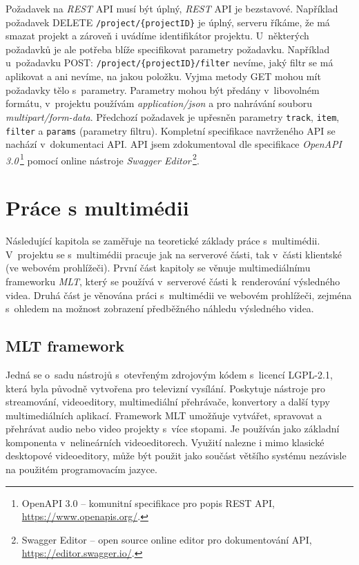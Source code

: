 Požadavek na \textit{REST} API musí být úplný, \textit{REST} API je bezstavové. Například požadavek DELETE \texttt{/project/\{projectID\}} je úplný, serveru říkáme, že má smazat projekt a zároveň i uvádíme identifikátor projektu. U~některých požadavků je ale potřeba blíže specifikovat parametry požadavku. Například u~požadavku POST: \texttt{/project/\{projectID\}/filter} nevíme, jaký filtr se má aplikovat a ani nevíme, na jakou položku. Vyjma metody GET mohou mít požadavky tělo s~parametry. Parametry mohou být předány v~libovolném formátu, v~projektu používám \textit{application/json} a pro nahrávání souboru \textit{multipart/form-data}. Předchozí požadavek je upřesněn parametry \texttt{track}, \texttt{item}, \texttt{filter} a \texttt{params} (parametry filtru). Kompletní specifikace navrženého API se nachází v~dokumentaci API. API jsem zdokumentoval dle specifikace \textit{OpenAPI 3.0}\,\footnote{OpenAPI 3.0 -- komunitní specifikace pro popis REST API, \url{https://www.openapis.org/}.} pomocí online nástroje \textit{Swagger Editor}\,\footnote{Swagger Editor -- open source online editor pro dokumentování API, \url{https://editor.swagger.io/}.}.

\chapter{Práce s multimédii}
Následující kapitola se zaměřuje na teoretické základy práce s~multimédii. V~projektu se s~multimédii pracuje jak na serverové části, tak v~části klientské (ve webovém prohlížeči). První část kapitoly se věnuje multimediálnímu frameworku \textit{MLT}, který se používá v~serverové části k~renderování výsledného videa. Druhá část je věnována práci s~multimédii ve webovém prohlížeči, zejména s~ohledem na možnost zobrazení předběžného náhledu výsledného videa.

\section{MLT framework}
Jedná se o~sadu nástrojů s~otevřeným zdrojovým kódem s~licencí LGPL-2.1, která byla původně vytvořena pro televizní vysílání. Poskytuje nástroje pro streamování, videoeditory, multimediální přehrávače, konvertory a další typy multimediálních aplikací. Framework MLT umožňuje vytvářet, spravovat a přehrávat audio nebo video projekty s~více stopami. Je používán jako základní komponenta v~nelineárních videoeditorech. Využití nalezne i mimo klasické desktopové videoeditory, může být použit jako součást většího systému nezávisle na použitém programovacím jazyce.


